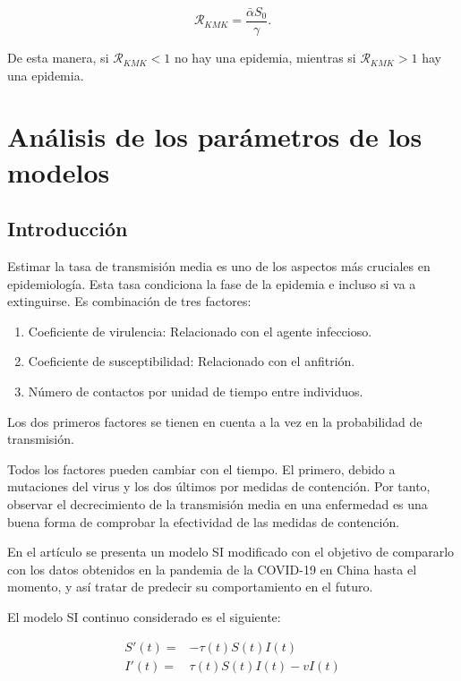 $$\mathcal{R}_{KMK}=\frac{\bar{\alpha} S_0}{\gamma}.$$

De esta manera, si $\mathcal{R}_{KMK}<1$ no hay una epidemia, mientras si $\mathcal{R}_{KMK}>1$ hay una epidemia. 





\section{Análisis de los parámetros de los modelos}

\subsection{Introducción}

Estimar la tasa de transmisión media es uno de los aspectos más cruciales en epidemiología. Esta tasa condiciona la fase de la epidemia e incluso si va a extinguirse. Es combinación de tres factores:

\begin{enumerate}
\item Coeficiente de virulencia: Relacionado con el agente infeccioso.
\item Coeficiente de susceptibilidad: Relacionado con el anfitrión.
\item Número de contactos por unidad de tiempo entre individuos.
\end{enumerate}

Los dos primeros factores se tienen en cuenta a la vez en la probabilidad de transmisión.

Todos los factores pueden cambiar con el tiempo. El primero, debido a mutaciones del virus y los dos últimos por medidas de contención. Por tanto, observar el decrecimiento de la transmisión media en una enfermedad es una buena forma de comprobar la efectividad de las medidas de contención.

En el artículo \cite{demongeotSIEpidemicModel} se presenta un modelo SI modificado con el objetivo de compararlo con los datos obtenidos en la pandemia de la COVID-19 en China hasta el momento, y así tratar de predecir su comportamiento en el futuro.

El modelo SI continuo considerado es el siguiente:

\begin{equation}
\label{eqn: SI_cont}
\begin{aligned}
S'(t) = & -\tau (t)S(t)I(t) \\
I'(t) = & \tau (t)S(t)I(t) -vI(t)
\end{aligned}
\end{equation}


